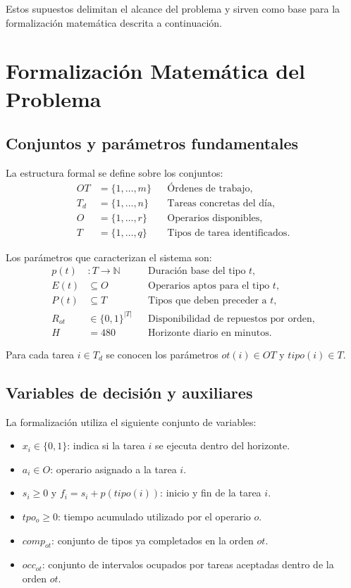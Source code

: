Estos supuestos delimitan el alcance del problema y sirven como base para la formalización matemática descrita a
continuación.

\section{Formalización Matemática del Problema}

\subsection{Conjuntos y parámetros fundamentales}

La estructura formal se define sobre los conjuntos:
\[
\begin{aligned}
OT &= \{1, \dots, m\} && \text{Órdenes de trabajo},\\
T_d &= \{1, \dots, n\} && \text{Tareas concretas del día},\\
O &= \{1, \dots, r\} && \text{Operarios disponibles},\\
T &= \{1, \dots, q\} && \text{Tipos de tarea identificados}.
\end{aligned}
\]

Los parámetros que caracterizan el sistema son:
\[
\begin{aligned}
p(t) &: T \rightarrow \mathbb{N} && \text{Duración base del tipo } t,\\
E(t) &\subseteq O && \text{Operarios aptos para el tipo } t,\\
P(t) &\subseteq T && \text{Tipos que deben preceder a } t,\\
R_{ot} &\in \{0,1\}^{|T|} && \text{Disponibilidad de repuestos por orden},\\
H &= 480 && \text{Horizonte diario en minutos}.
\end{aligned}
\]

Para cada tarea \(i \in T_d\) se conocen los parámetros \(ot(i) \in OT\) y \(tipo(i) \in T\).

\subsection{Variables de decisión y auxiliares}

La formalización utiliza el siguiente conjunto de variables:
\begin{itemize}
    \item \(x_i \in \{0,1\}\): indica si la tarea \(i\) se ejecuta dentro del horizonte.
    \item \(a_i \in O\): operario asignado a la tarea \(i\).
    \item \(s_i \geq 0\) y \(f_i = s_i + p(tipo(i))\): inicio y fin de la tarea \(i\).
    \item \(tpo_o \geq 0\): tiempo acumulado utilizado por el operario \(o\).
    \item \(comp_{ot}\): conjunto de tipos ya completados en la orden \(ot\).
    \item \(occ_{ot}\): conjunto de intervalos ocupados por tareas aceptadas dentro de la orden \(ot\).
\end{itemize}

